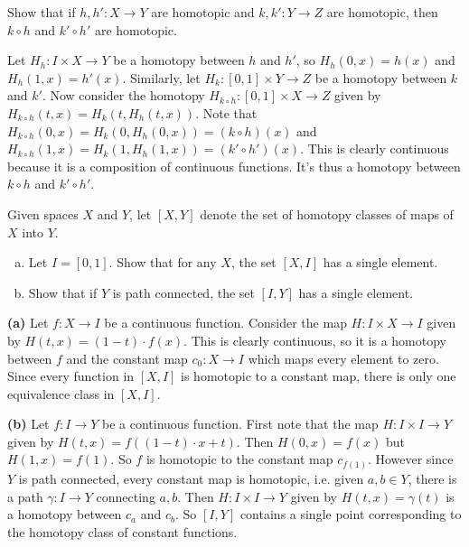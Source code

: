 \documentclass[11pt,letterpaper]{article}
\begin{document}
\begin{problem}
    Show that if $h, h' : X \to Y$ are homotopic and $k, k' : Y \to Z$ are homotopic, then $k\circ h$ and $k'\circ h'$ are homotopic.
\end{problem}

\begin{solution}
    Let $H_h : I\times X \to Y$ be a homotopy between $h$ and $h'$, so $H_h(0, x) = h(x)$ and $H_h(1, x)=h'(x)$. Similarly, let $H_k : [0,1] \times Y \to Z$ be a homotopy between $k$ and $k'$. Now consider the homotopy $H_{k\circ h} : [0,1]\times X \to Z$ given by $H_{k\circ h}(t, x)=H_k(t, H_h(t, x))$. Note that $H_{k\circ h}(0, x)=H_k(0, H_h(0, x))=(k\circ h)(x)$ and $H_{k\circ h}(1, x)=H_k(1, H_h(1, x))=(k'\circ h')(x)$. This is clearly continuous because it is a composition of continuous functions. It's thus a homotopy between $k\circ h$ and $k'\circ h'$. 
\end{solution}

\begin{problem}
    Given spaces $X$ and $Y$, let $[X, Y]$ denote the set of homotopy classes of maps of $X$ into $Y$.
    \begin{enumerate}[(a)]
        \item Let $I=[0,1]$. Show that for any $X$, the set $[X,I]$ has a single element.
        \item Show that if $Y$ is path connected, the set $[I,Y]$ has a single element.
    \end{enumerate}
\end{problem}

\begin{solution}
    \textbf{(a)} Let $f : X \to I$ be a continuous function. Consider the map $H : I\times X \to I$ given by $H(t,x)=(1-t)\cdot f(x)$. This is clearly continuous, so it is a homotopy between $f$ and the constant map $c_0 : X \to I$ which maps every element to zero. Since every function in $[X,I]$ is homotopic to a constant map, there is only one equivalence class in $[X,I]$. 

    \textbf{(b)} Let $f : I \to Y$ be a continuous function. First note that the map $H : I\times I \to Y$ given by $H(t,x)=f((1-t)\cdot x+t)$. Then $H(0,x)=f(x)$ but $H(1,x)=f(1)$. So $f$ is homotopic to the constant map $c_{f(1)}$. However since $Y$ is path connected, every constant map is homotopic, i.e. given $a,b\in Y$, there is a path $\gamma : I \to Y$ connecting $a,b$. Then $H : I\times I \to Y$ given by $H(t,x)=\gamma(t)$ is a homotopy between $c_a$ and $c_b$. So $[I,Y]$ contains a single point corresponding to the homotopy class of constant functions.  
\end{solution}
\end{document}
